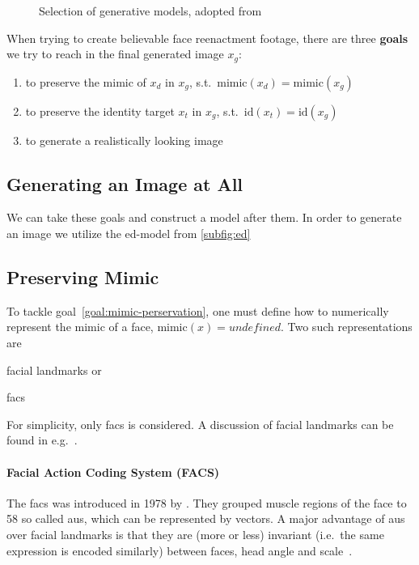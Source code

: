 \begin{figure}[h]
    \centering
    \caption{Selection of generative models, adopted from~\cite{Mirsky.2020}}\label{fig:generative-models}
\end{figure}

When trying to create believable face reenactment footage, there are three \textbf{goals}
we try to reach in the final generated image \(x_g\):
\begin{enumerate}[1.)]
    \item to preserve the mimic of \(x_d\) in \(x_g\), s.t.\ \(\text{mimic}(x_d)=\text{mimic}(x_g)\)\label{goal:mimic-perservation}
    \item to preserve the identity target \(x_t\) in \(x_g\), s.t.\ \(\text{id}(x_t)=\text{id}(x_g)\)\label{goal:preserve-identity}
    \item to generate a realistically looking image\label{goal:increase-realism}
\end{enumerate}
\subsection{Generating an Image at All}
We can take these goals and construct a model after them. In order to generate
an image we utilize the \gls{ed}-model from \cref{subfig:ed}

\subsection{Preserving Mimic}
To tackle goal~\ref{goal:mimic-perservation}, one must define how to
numerically represent the mimic of a face, \(\text{mimic}(x)=\textit{undefined}\).
Two such representations are
\begin{enumerate*}[a.)]
    \item facial landmarks or
    \item \gls{facs}
\end{enumerate*}
For simplicity, only \gls{facs} is considered. A discussion of facial landmarks
can be found in e.g.\ \cite{Ha.2020}.

\paragraph*{Facial Action Coding System (FACS)}
The \gls{facs} was introduced in 1978 by \textcite{Ekman.1978}. They grouped
muscle regions of the face to 58 so called \glspl{au}, which can be represented
by vectors. A major advantage of \glspl{au} over facial landmarks is that they
are (more or less) invariant (i.e.\ the same expression is encoded similarly)
between faces, head angle and scale~\cite{Pham.2018}.

